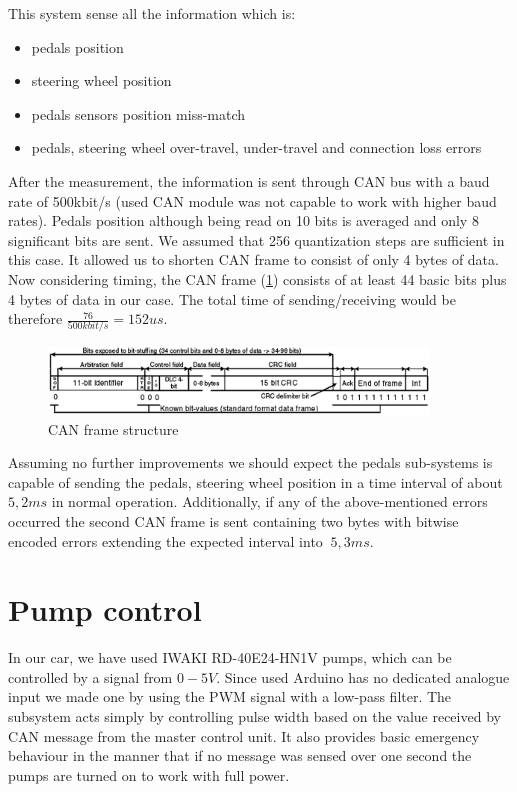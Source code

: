 This system sense all the information which is:
\begin{itemize}
    \item pedals position
    \item steering wheel position
    \item pedals sensors position miss-match
    \item pedals, steering wheel over-travel, under-travel and connection loss errors
\end{itemize}

After the measurement, the information is sent through CAN bus with a baud rate of 500kbit/s (used CAN module was not capable to work with higher baud rates). Pedals position although being read on 10 bits is averaged and only 8 significant bits are sent. We assumed that 256 quantization steps are sufficient in this case. It allowed us to shorten CAN frame to consist of only 4 bytes of data.
Now considering timing, the CAN frame (\ref{fig:CAN_FRAME}) consists of at least 44 basic bits plus 4 bytes of data in our case. The total time of sending/receiving would be therefore $\frac{76}{500kbit/s} = 152us$.

\begin{figure}[H]
    \centering
    \includegraphics[width=0.9\textwidth]{figures/CAN_FRAME.png}
    \caption{CAN frame structure \cite{CAN_stuffing}}
    \label{fig:CAN_FRAME}
\end{figure}

Assuming no further improvements we should expect the pedals sub-systems is capable of sending the pedals, steering wheel position in a time interval of about $5,2ms$\label{pedal_ideal_time} in normal operation.
Additionally, if any of the above-mentioned errors occurred the second CAN frame is sent containing two bytes with bitwise encoded errors extending the expected interval into $~5,3ms$.

\section{Pump control}\label{pump_control}
In our car, we have used IWAKI RD-40E24-HN1V pumps, which can be controlled by a signal from $0-5V$. Since used Arduino has no dedicated analogue input we made one by using the PWM signal with a low-pass filter.%
The subsystem acts simply by controlling pulse width based on the value received by CAN message from the master control unit. It also provides basic emergency behaviour in the manner that if no message was sensed over one second the pumps are turned on to work with full power.






